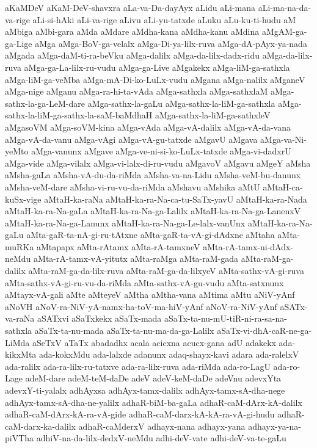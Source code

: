 {aKaMDeV
aKaM-DeV-shavxra
aLa-va-Da-dayAyx
aLidu
aLi-mana
aLi-ma-na-da-va-rige
aLi-si-hAki
aLi-va-rige
aLivu
aLi-yu-tatxde
aLuku
aLu-ku-ti-hudu
aM
aMbiga
aMbi-gara
aMda
aMdare
aMdha-kana
aMdha-kanu
aMdina
aMgAM-ga-ga-Lige
aMga
aMga-BoV-ga-velalx
aMga-Di-ya-lilx-ruva
aMga-dA-pAyx-ya-nada
aMgada
aMga-daM-ti-ra-beVku
aMga-dalilx
aMga-da-lilx-dadx-ridu
aMga-da-lilx-ruva
aMga-ga-La-lilx-ru-vudu
aMga-ga-Live
aMgakekx
aMga-liM-ga-sathxla
aMga-liM-ga-veMba
aMga-mA-Di-ko-LuLx-vudu
aMgana
aMga-nalilx
aMganeV
aMga-nige
aMganu
aMga-ra-hi-ta-vAda
aMga-sathxla
aMga-sathxlaM
aMga-sathx-la-ga-LeM-dare
aMga-sathx-la-gaLu
aMga-sathx-la-liM-ga-sathxla
aMga-sathx-la-liM-ga-sathx-la-saM-baMdhaH
aMga-sathx-la-liM-ga-sathxleV
aMgasoVM
aMga-soVM-kina
aMga-vAda
aMga-vA-dalilx
aMga-vA-da-vana
aMga-vA-da-vanu
aMga-vAgi
aMga-vA-gu-tatxde
aMgavU
aMgava
aMga-va-Ni-yeMto
aMga-vanunx
aMgave
aMga-ve-ni-si-ko-LuLx-tatxde
aMga-vi-dadxrU
aMga-vide
aMga-vilalx
aMga-vi-lalx-di-ru-vudu
aMgavoV
aMgavu
aMgeY
aMsha
aMsha-gaLa
aMsha-vA-du-da-riMda
aMsha-va-na-Lidu
aMsha-veM-bu-danunx
aMsha-veM-dare
aMsha-vi-ru-vu-da-riMda
aMshavu
aMshika
aMtU
aMtaH-ca-kuSx-vige
aMtaH-ka-raNa
aMtaH-ka-ra-Na-ca-tu-SaTx-yavU
aMtaH-ka-ra-Nada
aMtaH-ka-ra-Na-gaLa
aMtaH-ka-ra-Na-ga-Lalilx
aMtaH-ka-ra-Na-ga-LanenxV
aMtaH-ka-ra-Na-ga-Lanunx
aMtaH-ka-ra-Na-ga-Le-lalx-vanUnx
aMtaH-ka-ra-Na-gaLu
aMta-gaR-ta-nA-gi-ru-tAtxne
aMta-gaR-ta-vA-gi-dAdxne
aMtaha
aMta-muRKa
aMtapapx
aMta-rAtamx
aMta-rA-tamxneV
aMta-rA-tamx-ni-dAdx-neMdu
aMta-rA-tamx-vA-yitutx
aMta-raMga
aMta-raM-gada
aMta-raM-ga-dalilx
aMta-raM-ga-da-lilx-ruva
aMta-raM-ga-da-lilxyeV
aMta-sathx-vA-gi-ruva
aMta-sathx-vA-gi-ru-vu-da-riMda
aMta-sathx-vA-gu-vudu
aMta-satxnunx
aMtayx-vA-gali
aMte
aMteyeV
aMtha
aMtha-vana
aMtima
aMtu
aNiV-yAnf
aNoVH
aNoV-ra-NiV-yA-namx-ha-toV-ma-hiV-yAnf
aNoV-ra-NiV-yAnf
aSATx-va-raNa
aSATxvi
aSaTxkekx
aSaTx-mada
aSaTx-ta-nu-mU-tiR-ni-ra-sa-na-sathxla
aSaTx-ta-nu-mada
aSaTx-ta-nu-ma-da-ga-Lalilx
aSaTx-vi-dhA-caR-ne-ga-LiMda
aSeTxV
aTaTx
abadadhx
acala
acicxna
acucx-gana
adU
adakekx
ada-kikxMta
ada-kokxMdu
ada-lalxde
adanunx
adaq-shayx-kavi
adara
ada-ralelxV
ada-ralilx
ada-ra-lilx-ru-tatxve
ada-ra-lilx-ruva
ada-riMda
ada-ro-LagU
ada-ro-Lage
adeM-dare
adeM-teM-daDe
adeV
adeV-keM-daDe
adeVnu
adevxYta
adevxY-ti-yalalx
adhAyxsa
adhAyx-tamx-dalilx
adhAyx-tamx-sA-dha-nege
adhAyx-tamx-sA-dha-ne-yalilx
adhaR-biM-ba-gaLa
adhaR-caM-dArx-kA-dalilx
adhaR-caM-dArx-kA-ra-vA-gide
adhaR-caM-darx-kA-kA-ra-vA-gi-hudu
adhaR-caM-darx-ka-dalilx
adhaR-caMderxV
adhayx-nana
adhayx-yana
adhayx-ya-na-piVTha
adhiV-na-da-lilx-dedxV-neMdu
adhi-deV-vate
adhi-deV-va-te-gaLu
}
